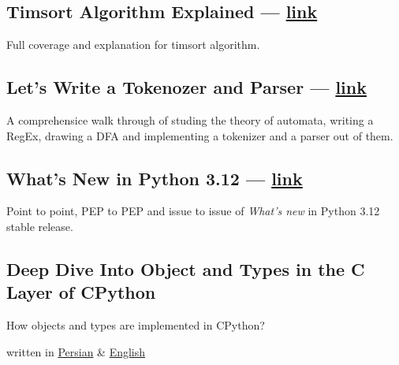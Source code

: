 \begin{multicols}{2}
\subsection{{Timsort Algorithm Explained --- \href{https://virgool.io/@liewpl/timsort-algorithm-u41h0wv0jnax}{link}}}
\begin{zitemize}
\item Full coverage and explanation for {\ttfamily timsort} algorithm.
\end{zitemize}

\subsection{{Let's Write a Tokenozer and Parser --- \href{https://virgool.io/@liewpl/tokenizer-parser-in-python-ubzlsvukmdxz}{link}}}
\begin{zitemize}
\item A comprehensice walk through of studing the theory of automata, writing a RegEx, drawing a DFA and implementing a tokenizer and a parser out of them.
\end{zitemize}

\subsection{{What's New in Python 3.12 --- \href{https://virgool.io/@liewpl/python-3-12-whats-new-vpq99njtytc6}{link}}}
\begin{zitemize}
\item Point to point, PEP to PEP and issue to issue of \textit{What's new} in Python 3.12 stable release.
\end{zitemize}

\subsection{{Deep Dive Into Object and Types in the C Layer of CPython}}
\begin{zitemize}
\item How objects and types are implemented in CPython?
\item written in \href{https://virgool.io/@liewpl/cpython-objs-types-c-layer-deep-dive-m5fjelhzrzny}{Persian}
\& \href{https://virgool.io/@liewpl/cpython-objs-types-c-layer-deep-dive-m5fjelhzrzny}{English}
\end{zitemize}


\end{multicols}
